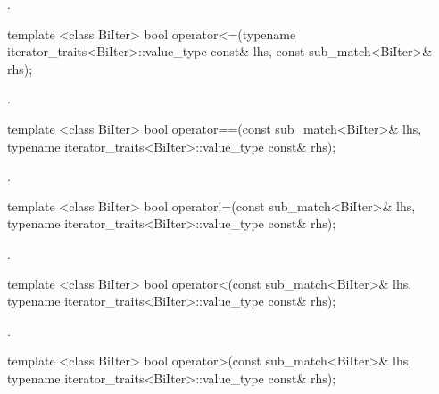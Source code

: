 \documentclass[ebook,11pt,article]{memoir}
\begin{document}
\begin{itemdescr}
\pnum
\returns {}.
\end{itemdescr}

\begin{itemdecl}
template <class BiIter> 
  bool operator<=(typename iterator_traits<BiIter>::value_type const& lhs, 
                  const sub_match<BiIter>& rhs); 
\end{itemdecl}

\begin{itemdescr}
\pnum
\returns {}.
\end{itemdescr}

\begin{itemdecl}
template <class BiIter> 
  bool operator==(const sub_match<BiIter>& lhs, 
                  typename iterator_traits<BiIter>::value_type const& rhs); 
\end{itemdecl}

\begin{itemdescr}
\pnum
\returns {}.
\end{itemdescr}

\begin{itemdecl}
template <class BiIter> 
  bool operator!=(const sub_match<BiIter>& lhs, 
                  typename iterator_traits<BiIter>::value_type const& rhs); 
\end{itemdecl}

\begin{itemdescr}
\pnum
\returns {}.
\end{itemdescr}

\begin{itemdecl}
template <class BiIter> 
  bool operator<(const sub_match<BiIter>& lhs, 
                 typename iterator_traits<BiIter>::value_type const& rhs); 
\end{itemdecl}

\begin{itemdescr}
\pnum
\returns {}.
\end{itemdescr}

\begin{itemdecl}
template <class BiIter> 
  bool operator>(const sub_match<BiIter>& lhs, 
                 typename iterator_traits<BiIter>::value_type const& rhs); 
\end{itemdecl}
\end{document}
